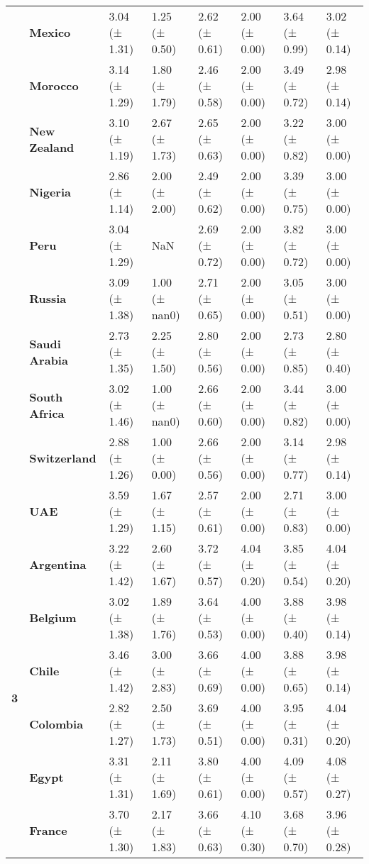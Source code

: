 \begin{longtable}{llllllll}
\textbf{} & \textbf{Mexico} & 3.04 (± 1.31) & 1.25 (± 0.50) & 2.62 (± 0.61) & 2.00 (± 0.00) & 3.64 (± 0.99) & 3.02 (± 0.14) \\
\textbf{} & \textbf{Morocco} & 3.14 (± 1.29) & 1.80 (± 1.79) & 2.46 (± 0.58) & 2.00 (± 0.00) & 3.49 (± 0.72) & 2.98 (± 0.14) \\
\textbf{} & \textbf{New Zealand} & 3.10 (± 1.19) & 2.67 (± 1.73) & 2.65 (± 0.63) & 2.00 (± 0.00) & 3.22 (± 0.82) & 3.00 (± 0.00) \\
\textbf{} & \textbf{Nigeria} & 2.86 (± 1.14) & 2.00 (± 2.00) & 2.49 (± 0.62) & 2.00 (± 0.00) & 3.39 (± 0.75) & 3.00 (± 0.00) \\
\textbf{} & \textbf{Peru} & 3.04 (± 1.29) & NaN & 2.69 (± 0.72) & 2.00 (± 0.00) & 3.82 (± 0.72) & 3.00 (± 0.00) \\
\textbf{} & \textbf{Russia} & 3.09 (± 1.38) & 1.00 (± nan0) & 2.71 (± 0.65) & 2.00 (± 0.00) & 3.05 (± 0.51) & 3.00 (± 0.00) \\
\textbf{} & \textbf{Saudi Arabia} & 2.73 (± 1.35) & 2.25 (± 1.50) & 2.80 (± 0.56) & 2.00 (± 0.00) & 2.73 (± 0.85) & 2.80 (± 0.40) \\
\textbf{} & \textbf{South Africa} & 3.02 (± 1.46) & 1.00 (± nan0) & 2.66 (± 0.60) & 2.00 (± 0.00) & 3.44 (± 0.82) & 3.00 (± 0.00) \\
\textbf{} & \textbf{Switzerland} & 2.88 (± 1.26) & 1.00 (± 0.00) & 2.66 (± 0.56) & 2.00 (± 0.00) & 3.14 (± 0.77) & 2.98 (± 0.14) \\
\textbf{} & \textbf{UAE} & 3.59 (± 1.29) & 1.67 (± 1.15) & 2.57 (± 0.61) & 2.00 (± 0.00) & 2.71 (± 0.83) & 3.00 (± 0.00) \\
\cline{1-8}
\multirow[t]{19}{*}{\textbf{3}} & \textbf{Argentina} & 3.22 (± 1.42) & 2.60 (± 1.67) & 3.72 (± 0.57) & 4.04 (± 0.20) & 3.85 (± 0.54) & 4.04 (± 0.20) \\
\textbf{} & \textbf{Belgium} & 3.02 (± 1.38) & 1.89 (± 1.76) & 3.64 (± 0.53) & 4.00 (± 0.00) & 3.88 (± 0.40) & 3.98 (± 0.14) \\
\textbf{} & \textbf{Chile} & 3.46 (± 1.42) & 3.00 (± 2.83) & 3.66 (± 0.69) & 4.00 (± 0.00) & 3.88 (± 0.65) & 3.98 (± 0.14) \\
\textbf{} & \textbf{Colombia} & 2.82 (± 1.27) & 2.50 (± 1.73) & 3.69 (± 0.51) & 4.00 (± 0.00) & 3.95 (± 0.31) & 4.04 (± 0.20) \\
\textbf{} & \textbf{Egypt} & 3.31 (± 1.31) & 2.11 (± 1.69) & 3.80 (± 0.61) & 4.00 (± 0.00) & 4.09 (± 0.57) & 4.08 (± 0.27) \\
\textbf{} & \textbf{France} & 3.70 (± 1.30) & 2.17 (± 1.83) & 3.66 (± 0.63) & 4.10 (± 0.30) & 3.68 (± 0.70) & 3.96 (± 0.28) \\

\end{longtable}
